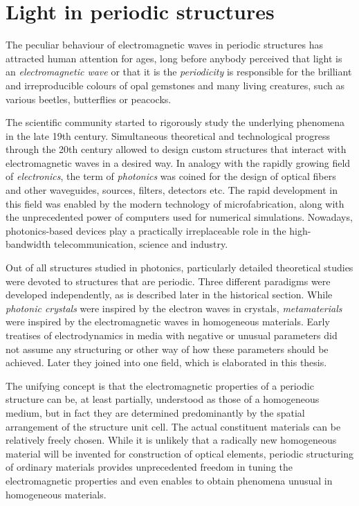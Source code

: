\section{Light in periodic structures} %
The peculiar behaviour of electromagnetic waves in periodic structures has attracted human attention for ages, long before anybody perceived that light is an \textit{electromagnetic wave} or that it is the \textit{periodicity} is responsible for the brilliant and irreproducible colours of opal gemstones and many living creatures, such as various beetles, butterflies or peacocks. 

The scientific community started to rigorously study the underlying phenomena in the late 19th century.
Simultaneous theoretical and technological progress through the 20th century allowed to design custom structures that interact with electromagnetic waves in a desired way. In analogy with the rapidly growing field of \textit{electronics}, the term of \textit{photonics} was coined for the design of optical fibers and other waveguides, sources, filters, detectors etc. The rapid development in this field was enabled by the modern technology of microfabrication, along with the unprecedented power of computers used for numerical simulations. Nowadays, photonics-based devices play a practically irreplaceable role in the high-bandwidth telecommunication, science and industry.

Out of all structures studied in photonics, particularly detailed theoretical studies were devoted to structures that are periodic. %
Three different paradigms were developed independently, as is described later in the historical section. While \textit{photonic crystals} were inspired by the electron waves in crystals, \textit{metamaterials} were inspired by the electromagnetic waves in homogeneous materials. Early treatises of electrodynamics in media with negative or unusual parameters did not assume any structuring or other way of how these parameters should be achieved. Later they joined into one field, which is elaborated in this thesis.

The unifying concept is that the electromagnetic properties of a periodic structure can be, at least partially, understood as those of a homogeneous medium, but in fact they are determined predominantly by the spatial arrangement of the structure unit cell. The actual constituent materials can be relatively freely chosen. %
While it is unlikely that a radically new homogeneous material will be invented for construction of optical elements, periodic structuring of ordinary materials provides unprecedented freedom in tuning the electromagnetic properties and even enables to obtain phenomena unusual in homogeneous materials. 

